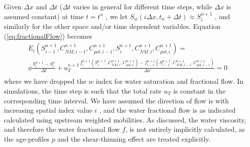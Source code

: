 \documentclass[energies,article,submit,moreauthors,pdftex]{Definitions/mdpi}
\begin{document}
Given  $\Delta x$ and $\Delta t$ ($\Delta t$  varies in general for different time steps, while $\Delta x$ is assumed constant) at time $t=t^n$ , we let $S_w(i\Delta x, t_n+\Delta t) \approx S_i^{n+1}$ , and similarly for the other space and/or time dependent variables. Equation (\ref{eq:fractionalFlow}) becomes
\begin{multline}%
    E_i \left(S^{n+1}_{i-1}, C^{n+1}_{\textit{NM}, i-1}, C^{n+1}_{pol, i-1}, S^{n+1}_{i}, C^{n+1}_{\textit{NM}, i}, C^{n+1}_{pol, i}\right)  = \\ \phi\frac{S^{n+1}_{i}-S^{n}_{i}}{\Delta t} +u_T^{n+1}\frac{f_i^{n+1}\left(S^{n+1}_{i}, C^{n+1}_{\textit{NM}, i}, C^{n+1}_{pol, i}  \right) - f_{i-1}^{n+1}\left(S^{n+1}_{i-1}, C^{n+1}_{\textit{NM}, i-1}, C^{n+1}_{pol, i-1}  \right)}{\Delta x}  = 0 \\
    \quad
\end{multline} 
where we have dropped the $w$  index for water saturation and fractional flow. In simulations, the time step is such that the total rate  $u_T$ is constant in the corresponding time interval. We have assumed the direction of flow is with increasing spatial index value $i$ , and the water fractional flow is as indicated calculated using upstream weighted mobilities. As discussed, the water viscosity, and therefore the water fractional flow $f$, is not entirely implicitly calculated, as the age-profiles $p$ and the shear-thinning effect are treated explicitly.
\end{document}
